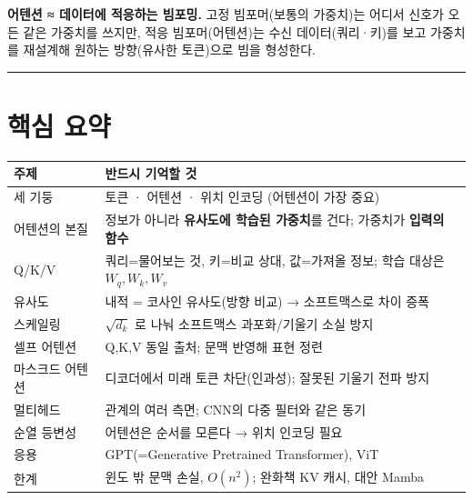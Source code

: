 \documentclass[
  korean,
]{article}
\newcounter{none} %
\begin{document}
\begin{tcolorbox}[enhanced jigsaw, arc=.35mm, bottomrule=.15mm, bottomtitle=1mm, breakable, colback=white, colbacktitle=quarto-callout-tip-color!10!white, colframe=quarto-callout-tip-color-frame, coltitle=black, left=2mm, leftrule=.75mm, opacityback=0, opacitybacktitle=0.6, rightrule=.15mm, title=\textcolor{quarto-callout-tip-color}{\faLightbulb}\hspace{0.5em}{한 줄 요약 비유}, titlerule=0mm, toprule=.15mm, toptitle=1mm]

\textbf{어텐션 ≈ 데이터에 적응하는 빔포밍.} 고정 빔포머(보통의 가중치)는
어디서 신호가 오든 같은 가중치를 쓰지만, 적응 빔포머(어텐션)는 수신
데이터(쿼리·키)를 보고 가중치를 재설계해 원하는 방향(유사한 토큰)으로
빔을 형성한다.

\end{tcolorbox}

\begin{center}\rule{0.5\linewidth}{0.5pt}\end{center}

\section{핵심 요약}\label{sec-summary}

{\def\LTcaptype{none} %
\begin{longtable}[]{@{}
  >{\raggedright\arraybackslash}p{}
  >{\raggedright\arraybackslash}p{}@{}}
\toprule\noalign{}
\begin{minipage}[b]{\linewidth}\raggedright
주제
\end{minipage} & \begin{minipage}[b]{\linewidth}\raggedright
반드시 기억할 것
\end{minipage} \\
\midrule\noalign{}
\endhead
\bottomrule\noalign{}
\endlastfoot
세 기둥 & 토큰 · 어텐션 · 위치 인코딩 (어텐션이 가장 중요) \\
어텐션의 본질 & 정보가 아니라 \textbf{유사도에 학습된 가중치}를 건다;
가중치가 \textbf{입력의 함수} \\
Q/K/V & 쿼리=물어보는 것, 키=비교 상대, 값=가져올 정보; 학습 대상은
\(W_q,W_k,W_v\) \\
유사도 & 내적 = 코사인 유사도(방향 비교) → 소프트맥스로 차이 증폭 \\
스케일링 & \(\sqrt{d_k}\) 로 나눠 소프트맥스 과포화/기울기 소실 방지 \\
셀프 어텐션 & Q,K,V 동일 출처; 문맥 반영해 표현 정련 \\
마스크드 어텐션 & 디코더에서 미래 토큰 차단(인과성); 잘못된 기울기 전파
방지 \\
멀티헤드 & 관계의 여러 측면; CNN의 다중 필터와 같은 동기 \\
순열 등변성 & 어텐션은 순서를 모른다 → 위치 인코딩 필요 \\
응용 & GPT(=Generative Pretrained Transformer), ViT \\
한계 & 윈도 밖 문맥 손실, \(O(n^2)\); 완화책 KV 캐시, 대안 Mamba \\
\end{longtable}
}
\end{document}
